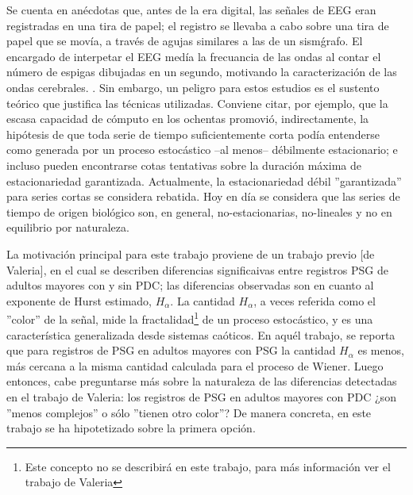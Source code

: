 Se cuenta en an\'ecdotas que, antes de la era digital, las
se\~nales de EEG eran registradas en una tira de papel; el registro se llevaba a cabo
sobre una tira de papel que se mov\'ia, a trav\'es de agujas similares a las de un sism\'grafo.
El encargado de interpetar el EEG med\'ia
la frecuancia de las ondas al contar el n\'umero de espigas dibujadas
en un segundo, 
motivando la caracterizaci\'on de las ondas cerebrales.
\cite{Klonowski09}.
Sin embargo, un peligro para estos estudios es el sustento te\'orico que justifica las
t\'ecnicas utilizadas. Conviene citar, por ejemplo, que
la escasa capacidad de c\'omputo 
en los ochentas
promovi\'o, indirectamente,
la hip\'otesis de que {toda} serie de tiempo suficientemente corta pod\'ia entenderse
como generada por un proceso estoc\'astico --al menos-- d\'ebilmente estacionario; 
e incluso
pueden encontrarse
cotas 
tentativas
sobre la duraci\'on m\'axima de estacionariedad garantizada. 
Actualmente, la estacionariedad d\'ebil ''garantizada'' para series cortas se considera 
rebatida\cite{Melard89,Adak98,Klonowski09}.
Hoy en d\'ia se considera que las series de tiempo de origen biol\'ogico son, en general,
no-estacionarias, no-lineales y no en equilibrio por naturaleza.


La motivaci\'on principal para este trabajo proviene de un trabajo previo [de Valeria],
en el cual se describen diferencias significaivas entre registros PSG de
adultos mayores con y sin PDC; las diferencias observadas son en cuanto al exponente de Hurst 
estimado, $H_\alpha$.
La cantidad $H_\alpha$, a veces referida como el ''color'' de la se\~nal, 
mide la fractalidad\footnote{Este concepto no se
describir\'a en este trabajo, para m\'as informaci\'on ver el trabajo de Valeria} 
de un proceso estoc\'astico, y es una caracter\'istica generalizada desde sistemas ca\'oticos.
En aqu\'el trabajo, se reporta que
para registros de PSG en adultos mayores con PSG la cantidad $H_\alpha$ es menos, m\'as
cercana a la misma cantidad calculada para el proceso de Wiener.
Luego entonces, cabe preguntarse m\'as sobre la naturaleza de las diferencias detectadas en 
el trabajo de Valeria: los registros de PSG en adultos mayores con PDC ¿son ''menos complejos'' o 
s\'olo ''tienen otro color''?
De manera concreta, en este trabajo se ha hipotetizado sobre la primera opci\'on. 

